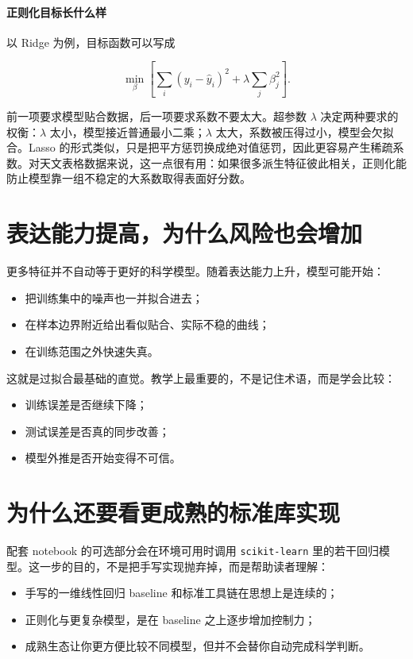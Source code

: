 \paragraph{正则化目标长什么样}

以 Ridge 为例，目标函数可以写成

\[
\min_\beta
\left[
\sum_i (y_i-\hat{y}_i)^2
+
\lambda \sum_j \beta_j^2
\right].
\]

前一项要求模型贴合数据，后一项要求系数不要太大。超参数 \(\lambda\) 决定两种要求的权衡：\(\lambda\) 太小，模型接近普通最小二乘；\(\lambda\) 太大，系数被压得过小，模型会欠拟合。Lasso 的形式类似，只是把平方惩罚换成绝对值惩罚，因此更容易产生稀疏系数。对天文表格数据来说，这一点很有用：如果很多派生特征彼此相关，正则化能防止模型靠一组不稳定的大系数取得表面好分数。

\section{表达能力提高，为什么风险也会增加}

更多特征并不自动等于更好的科学模型。随着表达能力上升，模型可能开始：

\begin{itemize}
    \item 把训练集中的噪声也一并拟合进去；
    \item 在样本边界附近给出看似贴合、实际不稳的曲线；
    \item 在训练范围之外快速失真。
\end{itemize}

这就是过拟合最基础的直觉。教学上最重要的，不是记住术语，而是学会比较：

\begin{itemize}
    \item 训练误差是否继续下降；
    \item 测试误差是否真的同步改善；
    \item 模型外推是否开始变得不可信。
\end{itemize}

\section{为什么还要看更成熟的标准库实现}

配套 notebook 的可选部分会在环境可用时调用 \texttt{scikit-learn} 里的若干回归模型。这一步的目的，不是把手写实现抛弃掉，而是帮助读者理解：

\begin{itemize}
    \item 手写的一维线性回归 baseline 和标准工具链在思想上是连续的；
    \item 正则化与更复杂模型，是在 baseline 之上逐步增加控制力；
    \item 成熟生态让你更方便比较不同模型，但并不会替你自动完成科学判断。
\end{itemize}


